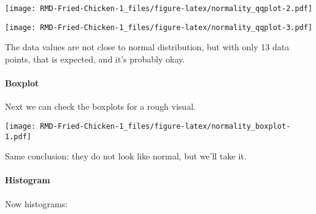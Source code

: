 \documentclass[
]{article}
\newenvironment{Shaded}{\begin{snugshade}}{\end{snugshade}}
\newcommand{\AttributeTok}[1]{\textcolor[rgb]{0.77,0.63,0.00}{#1}}
\newcommand{\CommentTok}[1]{\textcolor[rgb]{0.56,0.35,0.01}{\textit{#1}}}
\newcommand{\DecValTok}[1]{\textcolor[rgb]{0.00,0.00,0.81}{#1}}
\newcommand{\FunctionTok}[1]{\textcolor[rgb]{0.00,0.00,0.00}{#1}}
\newcommand{\NormalTok}[1]{#1}
\newcommand{\SpecialCharTok}[1]{\textcolor[rgb]{0.00,0.00,0.00}{#1}}
\newcommand{\StringTok}[1]{\textcolor[rgb]{0.31,0.60,0.02}{#1}}
\begin{document}
\texttt{[image: RMD-Fried-Chicken-1\_files/figure-latex/normality\_qqplot-2.pdf]}

\begin{Shaded}
\end{Shaded}

\texttt{[image: RMD-Fried-Chicken-1\_files/figure-latex/normality\_qqplot-3.pdf]}

The data values are not close to normal distribution, but with only 13
data points, that is expected, and it's probably okay.

\hypertarget{boxplot}{%
\paragraph{Boxplot}\label{boxplot}}

Next we can check the boxplots for a rough visual.

\begin{Shaded}
\end{Shaded}

\texttt{[image: RMD-Fried-Chicken-1\_files/figure-latex/normality\_boxplot-1.pdf]}

Same conclusion: they do not look like normal, but we'll take it.

\hypertarget{histogram}{%
\paragraph{Histogram}\label{histogram}}

Now histograms:
\end{document}
